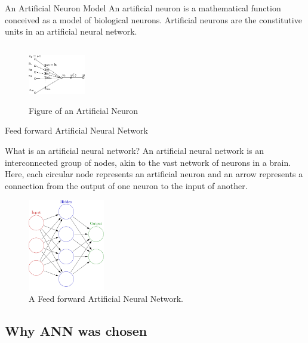 \documentclass[10pt]{beamer}
\begin{document}
\begin{frame}{An Artificial Neuron Model}
An artificial neuron is a mathematical function conceived as a model of biological neurons. Artificial neurons are the constitutive units in an artificial neural network. 

\begin{figure}
	\centering
    \includegraphics[width=2.5cm, height=2.5cm]{Artificial_neuron.png}
    \caption{Figure of an Artificial Neuron}
\end{figure}
\end{frame}

\begin{frame}{Feed forward Artificial Neural Network}

\begin{exampleblock}{What is an artificial neural network?}
An artificial neural network is an interconnected group of nodes, akin to the vast network of neurons in a brain. Here, each circular node represents an artificial neuron and an arrow represents a connection from the output of one neuron to the input of another.
\end{exampleblock}

\begin{figure}
	\centering
    \includegraphics[height=4cm]{neuralnet.png}
    \caption{A Feed forward Artificial Neural Network.}
\end{figure}

\end{frame}

\subsection{Why ANN was chosen}
\end{document}
